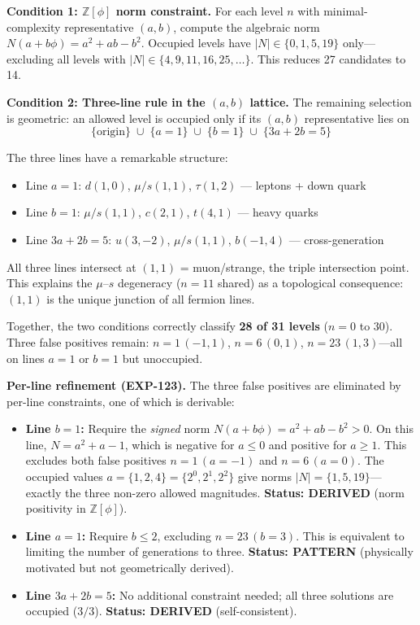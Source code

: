 \documentclass[12pt,a4paper]{article}
\begin{document}
\textbf{Condition 1: $\mathbb{Z}[\phi]$ norm constraint.} For each level $n$ with minimal-complexity representative $(a,b)$, compute the algebraic norm $N(a + b\phi) = a^2 + ab - b^2$. Occupied levels have $|N| \in \{0, 1, 5, 19\}$ only---excluding all levels with $|N| \in \{4, 9, 11, 16, 25, \ldots\}$. This reduces 27 candidates to 14.

\textbf{Condition 2: Three-line rule in the $(a,b)$ lattice.} The remaining selection is geometric: an allowed level is occupied only if its $(a,b)$ representative lies on
\begin{equation}
\{\text{origin}\} \;\cup\; \{a = 1\} \;\cup\; \{b = 1\} \;\cup\; \{3a + 2b = 5\}
\end{equation}

The three lines have a remarkable structure:
\begin{itemize}
    \item Line $a = 1$: $d(1,0)$, $\mu/s(1,1)$, $\tau(1,2)$ --- leptons + down quark
    \item Line $b = 1$: $\mu/s(1,1)$, $c(2,1)$, $t(4,1)$ --- heavy quarks
    \item Line $3a+2b = 5$: $u(3,-2)$, $\mu/s(1,1)$, $b(-1,4)$ --- cross-generation
\end{itemize}

All three lines intersect at $(1,1)$ = muon/strange, the triple intersection point. This explains the $\mu$--$s$ degeneracy ($n=11$ shared) as a topological consequence: $(1,1)$ is the unique junction of all fermion lines.

Together, the two conditions correctly classify \textbf{28 of 31 levels} ($n = 0$ to $30$). Three false positives remain: $n = 1\,(-1,1)$, $n = 6\,(0,1)$, $n = 23\,(1,3)$---all on lines $a=1$ or $b=1$ but unoccupied.

\textbf{Per-line refinement (EXP-123).} The three false positives are eliminated by per-line constraints, one of which is derivable:
\begin{itemize}
    \item \textbf{Line $b = 1$:} Require the \emph{signed} norm $N(a + b\phi) = a^2 + ab - b^2 > 0$. On this line, $N = a^2 + a - 1$, which is negative for $a \leq 0$ and positive for $a \geq 1$. This excludes both false positives $n = 1\,(a=-1)$ and $n = 6\,(a=0)$. The occupied values $a = \{1, 2, 4\} = \{2^0, 2^1, 2^2\}$ give norms $|N| = \{1, 5, 19\}$---exactly the three non-zero allowed magnitudes. \textbf{Status: DERIVED} (norm positivity in $\mathbb{Z}[\phi]$).
    \item \textbf{Line $a = 1$:} Require $b \leq 2$, excluding $n = 23\,(b=3)$. This is equivalent to limiting the number of generations to three. \textbf{Status: PATTERN} (physically motivated but not geometrically derived).
    \item \textbf{Line $3a + 2b = 5$:} No additional constraint needed; all three solutions are occupied ($3/3$). \textbf{Status: DERIVED} (self-consistent).
\end{itemize}
\end{document}
